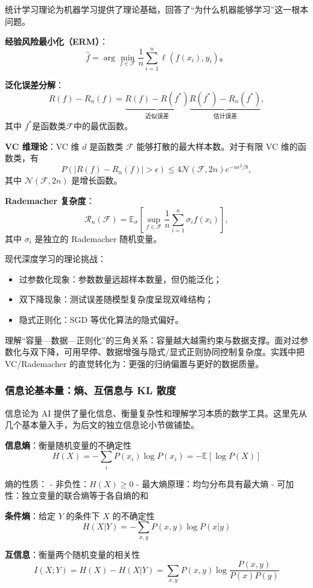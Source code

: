 统计学习理论为机器学习提供了理论基础，回答了“为什么机器能够学习”这一根本问题。

\textbf{经验风险最小化（ERM）}：
$$\hat{f} = \arg\min_{f \in \mathcal{F}} \frac{1}{n}\sum_{i=1}^n \ell(f(x_i), y_i)。$$

\textbf{泛化误差分解}：
$$R(f) - R_n(f) = \underbrace{R(f) - R(f^*)}_{\text{近似误差}}  \underbrace{R(f^*) - R_n(f^*)}_{\text{估计误差}}, $$
其中 $f^*$是函数类$\mathcal{F}$中的最优函数。

\textbf{VC 维理论}：VC 维 $d$ 是函数类 $\mathcal{F}$ 能够打散的最大样本数。对于有限 VC 维的函数类，有
$$
P\left(|R(f) - R_n(f)| > \epsilon\right) \leq 4\mathcal{N}(\mathcal{F}, 2n)e^{-n\epsilon^2/8},
$$
其中 $\mathcal{N}(\mathcal{F}, 2n)$ 是增长函数。

\textbf{Rademacher 复杂度}：
$$
\mathcal{R}_n(\mathcal{F}) = \mathbb{E}_{\sigma}\left[\sup_{f \in \mathcal{F}} \frac{1}{n}\sum_{i=1}^n \sigma_i f(x_i)\right],
$$
其中 $\sigma_i$ 是独立的 Rademacher 随机变量。

现代深度学习的理论挑战：
\begin{itemize}
  \item 过参数化现象：参数数量远超样本数量，但仍能泛化；
  \item 双下降现象：测试误差随模型复杂度呈现双峰结构；
  \item 隐式正则化：SGD 等优化算法的隐式偏好。
\end{itemize}

理解“容量—数据—正则化”的三角关系：容量越大越需约束与数据支撑。面对过参数化与双下降，可用早停、数据增强与隐式/显式正则协同控制复杂度。实践中把 VC/Rademacher 的直觉转化为：更强的归纳偏置与更好的数据质量。

\subsubsection{信息论基本量：熵、互信息与 KL 散度}

信息论为 AI 提供了量化信息、衡量复杂性和理解学习本质的数学工具。这里先从几个基本量入手，为后文的独立信息论小节做铺垫。

\textbf{信息熵}：衡量随机变量的不确定性
$$H(X) = -\sum_{i} P(x_i) \log P(x_i) = -\mathbb{E}[\log P(X)]$$

熵的性质：
- 非负性：$H(X) \geq 0$
- 最大熵原理：均匀分布具有最大熵
- 可加性：独立变量的联合熵等于各自熵的和

\textbf{条件熵}：给定 $Y$ 的条件下 $X$ 的不确定性
$$H(X|Y) = -\sum_{x,y} P(x,y) \log P(x|y)$$

\textbf{互信息}：衡量两个随机变量的相关性
$$I(X;Y) = H(X) - H(X|Y) = \sum_{x,y} P(x,y) \log \frac{P(x,y)}{P(x)P(y)}$$

